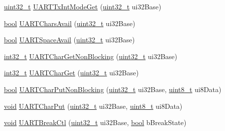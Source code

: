 \begin{DoxyCompactItemize}
\item 
\hyperlink{_p_e___types_8h_a33594304e786b158f3fb30289278f5af}{uint32\+\_\+t} \hyperlink{group__uart__api_gabdf3ce387c17f9dee88b45ac7b15ad8c}{U\+A\+R\+T\+Tx\+Int\+Mode\+Get} (\hyperlink{_p_e___types_8h_a33594304e786b158f3fb30289278f5af}{uint32\+\_\+t} ui32\+Base)
\item 
\hyperlink{_p_e___types_8h_a97a80ca1602ebf2303258971a2c938e2}{bool} \hyperlink{group__uart__api_ga4ef85e7bc642ef7169d6641cfa5265c6}{U\+A\+R\+T\+Chars\+Avail} (\hyperlink{_p_e___types_8h_a33594304e786b158f3fb30289278f5af}{uint32\+\_\+t} ui32\+Base)
\item 
\hyperlink{_p_e___types_8h_a97a80ca1602ebf2303258971a2c938e2}{bool} \hyperlink{group__uart__api_ga7ef168edf854186daeafd031b7d55311}{U\+A\+R\+T\+Space\+Avail} (\hyperlink{_p_e___types_8h_a33594304e786b158f3fb30289278f5af}{uint32\+\_\+t} ui32\+Base)
\item 
\hyperlink{_p_e___types_8h_adb828ef50c2dbb783109824e94cf6c47}{int32\+\_\+t} \hyperlink{group__uart__api_gaad338221fc820412b005653855cedaf7}{U\+A\+R\+T\+Char\+Get\+Non\+Blocking} (\hyperlink{_p_e___types_8h_a33594304e786b158f3fb30289278f5af}{uint32\+\_\+t} ui32\+Base)
\item 
\hyperlink{_p_e___types_8h_adb828ef50c2dbb783109824e94cf6c47}{int32\+\_\+t} \hyperlink{group__uart__api_gafc065333d747a8f71331c4fa2b5ace9e}{U\+A\+R\+T\+Char\+Get} (\hyperlink{_p_e___types_8h_a33594304e786b158f3fb30289278f5af}{uint32\+\_\+t} ui32\+Base)
\item 
\hyperlink{_p_e___types_8h_a97a80ca1602ebf2303258971a2c938e2}{bool} \hyperlink{group__uart__api_ga0649824c67ebbfd57e9a09abfd7c0943}{U\+A\+R\+T\+Char\+Put\+Non\+Blocking} (\hyperlink{_p_e___types_8h_a33594304e786b158f3fb30289278f5af}{uint32\+\_\+t} ui32\+Base, \hyperlink{_p_e___types_8h_aba7bc1797add20fe3efdf37ced1182c5}{uint8\+\_\+t} ui8\+Data)
\item 
\hyperlink{usb__devapi_8h_afabf60e7f57651d6d595a02c75f07cd0}{void} \hyperlink{group__uart__api_ga047dde8396fa77bdc8648bea8875c7b9}{U\+A\+R\+T\+Char\+Put} (\hyperlink{_p_e___types_8h_a33594304e786b158f3fb30289278f5af}{uint32\+\_\+t} ui32\+Base, \hyperlink{_p_e___types_8h_aba7bc1797add20fe3efdf37ced1182c5}{uint8\+\_\+t} ui8\+Data)
\item 
\hyperlink{usb__devapi_8h_afabf60e7f57651d6d595a02c75f07cd0}{void} \hyperlink{group__uart__api_ga7c544618ac872b85cec285fdeaa50c3b}{U\+A\+R\+T\+Break\+Ctl} (\hyperlink{_p_e___types_8h_a33594304e786b158f3fb30289278f5af}{uint32\+\_\+t} ui32\+Base, \hyperlink{_p_e___types_8h_a97a80ca1602ebf2303258971a2c938e2}{bool} b\+Break\+State)

\end{DoxyCompactItemize}
